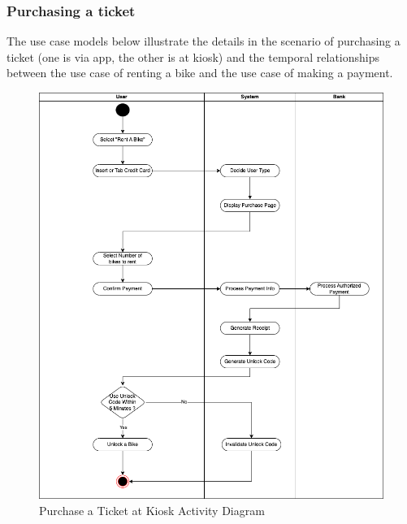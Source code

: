 \subsubsection{Purchasing a ticket}
The use case models below illustrate the details in the scenario of purchasing a ticket (one is via app, the other is at kiosk) and the temporal relationships between the use case of renting a bike and the use case of making a payment.
\begin{figure}[H]
  \centering
  \includegraphics[scale = 0.50]{images/PurchaseTicketAtKiosk.png}
  \caption{Purchase a Ticket at Kiosk Activity Diagram}
  \label{fig:Purchase a Ticket at Kiosk Activity Diagram}
\end{figure}
